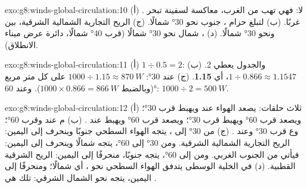 \begin{solution}{exo:g8:winds-global-circulation:10}
(أ) . لا: فهي تهب من الغرب، معاكسة لسفينة تبحر غربًا. (ب)
لتبلغ حزام ، جنوب نحو \ang{30} شمالًا. (ج) الريح
التجارية الشمالية الشرقية، بين  ونحو \ang{30} شمالًا. (د) ، شمال نحو \ang{30} شمالًا (قرب \ang{40} شمالًا، دائرة عرض ميناء
الانطلاق).
\end{solution}

\begin{solution}{exo:g8:winds-global-circulation:11}
(أ) $1 \div 0.5 = 2$: والجدول يعطي 2. (ب) $1 \div 0.866 \approx
1.1547$، أي \textbf{1.15}. (ج) عند \ang{30}: $1000 \div 1.15 \approx
\qty{870}{W}$ على كل متر مربع (وبالضبط $1000 \times 0.866 =
\qty{866}{W}$). وعند \ang{60}: $1000 \div 2 = \qty{500}{W}$.
\end{solution}

\begin{solution}{exo:g8:winds-global-circulation:12}
(أ) ثلاث حلقات: يصعد الهواء عند  ويهبط قرب \ang{30}؛
ويصعد قرب \ang{60} ويهبط قرب \ang{30}؛ ويصعد قرب \ang{60} ويهبط
عند . (ب) م عند  وقرب \ang{60}؛ وع قرب \ang{30} وعند
. (ج) من \ang{30} إلى ، يتجه الهواء السطحي جنوبًا
وينحرف إلى اليمين: الريح التجارية الشمالية الشرقية. ومن \ang{30} إلى
\ang{60}، يتجه شمالًا وينحرف إلى اليمين: فيأتي من الجنوب
الغربي. ومن  إلى \ang{60}، يتجه جنوبًا، منحرفًا إلى
اليمين: الريح الشرقية القطبية. (د) في الخلية الوسطى يتدفق الهواء السطحي
نحو ، أي شمالًا؛ ومنحرفًا إلى اليمين، يتجه نحو
الشمال الشرقي: تلك هي .
\end{solution}

